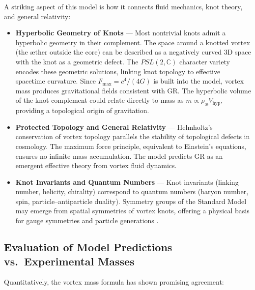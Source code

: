     A striking aspect of this model is how it connects fluid mechanics, knot theory, and general relativity:

    \begin{itemize}
        \item \textbf{Hyperbolic Geometry of Knots} — Most nontrivial knots admit a hyperbolic geometry in their complement. The space around a knotted vortex (the æther outside the core) can be described as a negatively curved 3D space with the knot as a geometric defect. The $PSL(2,\mathbb{C})$ character variety encodes these geometric solutions, linking knot topology to effective spacetime curvature. Since $F_{\max} = c^4/(4G)$ is built into the model, vortex mass produces gravitational fields consistent with GR. The hyperbolic volume of the knot complement could relate directly to mass as $m \propto \rho_{\text{\ae}} V_{\text{hyp}}$, providing a topological origin of gravitation.

        \item \textbf{Protected Topology and General Relativity} — Helmholtz’s conservation of vortex topology parallels the stability of topological defects in cosmology. The maximum force principle, equivalent to Einstein’s equations, ensures no infinite mass accumulation. The model predicts GR as an emergent effective theory from vortex fluid dynamics.

        \item \textbf{Knot Invariants and Quantum Numbers} — Knot invariants (linking number, helicity, chirality) correspond to quantum numbers (baryon number, spin, particle–antiparticle duality). Symmetry groups of the Standard Model may emerge from spatial symmetries of vortex knots, offering a physical basis for gauge symmetries and particle generations \cite{Iskandarani2025f,Avrin2012}.
    \end{itemize}

    \subsection{Evaluation of Model Predictions vs.\ Experimental Masses}

    Quantitatively, the vortex mass formula has shown promising agreement:

